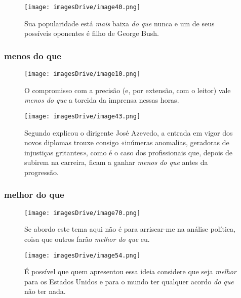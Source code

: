\documentclass[output=paper,colorlinks,citecolor=brown]{langscibook}
\begin{document}
	\begin{figure}
	    \centering
	    \texttt{[image: imagesDrive/image40.png]}
	    \caption{Sua popularidade está \emph{mais} baixa \emph{do que} nunca e um de seus possíveis oponentes é filho de George Bush.}
	    \label{fig:comparative4}
	\end{figure}{}

	\subsubsection{menos do que}

	\begin{figure}
	    \centering
	    \texttt{[image: imagesDrive/image10.png]}
	    \caption{O compromisso com a precisão (e, por extensão, com o leitor) vale \emph{menos do que} a torcida da imprensa nessas horas.}
	    \label{fig:comparative4}
	\end{figure}{}

	\begin{figure}
	    \centering
	    \texttt{[image: imagesDrive/image43.png]}
	    \caption{Segundo explicou o dirigente José Azevedo, a entrada em vigor dos novos diplomas trouxe consigo «inúmeras anomalias, geradoras de injustiças gritantes», como é o caso dos profissionais que, depois de subirem na carreira, ficam a ganhar \emph{menos do que} antes da progressão.}
	    \label{fig:comparative4}
	\end{figure}{}

	\subsubsection{melhor do que}

	\begin{figure}
	    \centering
	    \texttt{[image: imagesDrive/image70.png]}
	    \caption{Se abordo este tema aqui não é para arriscar-me na análise política, coisa que outros farão \emph{melhor do que} eu.}
	    \label{fig:comparative4}
	\end{figure}{}

	\begin{figure}
	    \centering
	    \texttt{[image: imagesDrive/image54.png]}
	    \caption{É possível que quem apresentou essa ideia considere que seja \emph{melhor} para os Estados Unidos e para o mundo ter qualquer acordo \emph{do que} não ter nada.}
	    \label{fig:comparative4}
	\end{figure}{}
\end{document}
